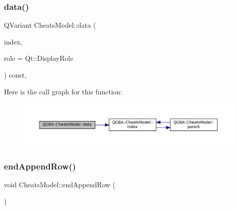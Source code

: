 \subsubsection{\texorpdfstring{data()}{data()}}
{\footnotesize\ttfamily Q\+Variant Cheats\+Model\+::data (\begin{DoxyParamCaption}\item[{const Q\+Model\+Index \&}]{index,  }\item[{\mbox{\hyperlink{ioapi_8h_a787fa3cf048117ba7123753c1e74fcd6}{int}}}]{role = {\ttfamily Qt\+:\+:DisplayRole} }\end{DoxyParamCaption}) const\hspace{0.3cm}{\ttfamily [override]}, {\ttfamily [virtual]}}

Here is the call graph for this function\+:
\nopagebreak
\begin{figure}[H]
\begin{center}
\leavevmode
\includegraphics[width=350pt]{class_q_g_b_a_1_1_cheats_model_a694bb3a5ce6c06b6507c230c0a7518b7_cgraph}
\end{center}
\end{figure}
\mbox{\label{class_q_g_b_a_1_1_cheats_model_adf72c74102cb610a47a03fe1251fa5e9}} 
\subsubsection{\texorpdfstring{end\+Append\+Row()}{endAppendRow()}}
{\footnotesize\ttfamily void Cheats\+Model\+::end\+Append\+Row (\begin{DoxyParamCaption}{ }\end{DoxyParamCaption})}

